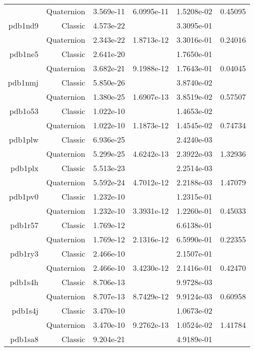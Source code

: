 \begin{xltabular}{\textwidth}{r|rS[table-format=1.3e+2]S[table-format=1.4e+2]S[table-format=1.4e+2]S[table-format=-1.5]}
& Quaternion & 3.569e-11 & 6.0995e-11 & 1.5208e-02 & 0.45095\\  \addlinespace
pdb1nd9 & Classic & 4.573e-22 &  & 3.3095e-01 & \\
& Quaternion & 2.343e-22 & 1.8713e-12 & 3.3016e-01 & 0.24016\\  \addlinespace
pdb1ne5 & Classic & 2.641e-20 &  & 1.7650e-01 & \\
& Quaternion & 3.682e-21 & 9.1988e-12 & 1.7643e-01 & 0.04045\\  \addlinespace
pdb1nmj & Classic & 5.850e-26 &  & 3.8740e-02 & \\
& Quaternion & 1.380e-25 & 1.6907e-13 & 3.8519e-02 & 0.57507\\  \addlinespace
pdb1o53 & Classic & 1.022e-10 &  & 1.4653e-02 & \\
& Quaternion & 1.022e-10 & 1.1873e-12 & 1.4545e-02 & 0.74734\\  \addlinespace
pdb1plw & Classic & 6.936e-25 &  & 2.4240e-03 & \\
& Quaternion & 5.299e-25 & 4.6242e-13 & 2.3922e-03 & 1.32936\\  \addlinespace
pdb1plx & Classic & 5.513e-23 &  & 2.2514e-03 & \\
& Quaternion & 5.592e-24 & 4.7012e-12 & 2.2188e-03 & 1.47079\\  \addlinespace
pdb1pv0 & Classic & 1.232e-10 &  & 1.2315e-01 & \\
& Quaternion & 1.232e-10 & 3.3931e-12 & 1.2260e-01 & 0.45033\\  \addlinespace
pdb1r57 & Classic & 1.769e-12 &  & 6.6138e-01 & \\
& Quaternion & 1.769e-12 & 2.1316e-12 & 6.5990e-01 & 0.22355\\  \addlinespace
pdb1ry3 & Classic & 2.466e-10 &  & 2.1507e-01 & \\
& Quaternion & 2.466e-10 & 3.4230e-12 & 2.1416e-01 & 0.42470\\  \addlinespace
pdb1s4h & Classic & 8.706e-13 &  & 9.9728e-03 & \\
& Quaternion & 8.707e-13 & 8.7429e-12 & 9.9124e-03 & 0.60958\\  \addlinespace
pdb1s4j & Classic & 3.470e-10 &  & 1.0673e-02 & \\
& Quaternion & 3.470e-10 & 9.2762e-13 & 1.0524e-02 & 1.41784\\  \addlinespace
pdb1sa8 & Classic & 9.204e-21 &  & 4.9189e-01 & \\

\end{xltabular}
